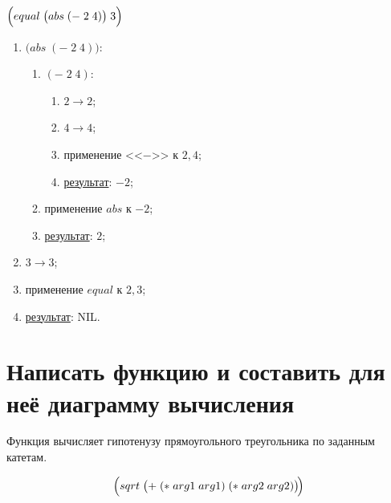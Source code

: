 \problem $\Bigl(equal\; \bigl(abs\; (-\; 2\; 4)\bigr)\; 3\Bigr)$

\begin{enumerate}
	\item $\bigl(abs\; (-\; 2\; 4)\bigr)$:
	\begin{enumerate}
		\item $(-\; 2\; 4)$:
		\begin{enumerate}
			\item $2 \to 2$;
			\item $4 \to 4$;
			\item применение <<$-$>> к $2, 4$;
			\item \underline{результат}: $-2$;
		\end{enumerate}
		\item применение $abs$ к $-2$;
		\item \underline{результат}: $2$;
	\end{enumerate}
	\item $3 \to 3$;
	\item применение $equal$ к $2, 3$;
	\item \underline{результат}: NIL.
\end{enumerate}



\section{Написать функцию и составить для неё диаграмму вычисления}

\problem Функция вычисляет гипотенузу прямоугольного треугольника по заданным катетам.


\[
	\Bigl(sqrt\; \bigl(+\; (*\; arg1\; arg1)\; (*\; arg2\; arg2)\bigr)\!\Bigr)
\]

